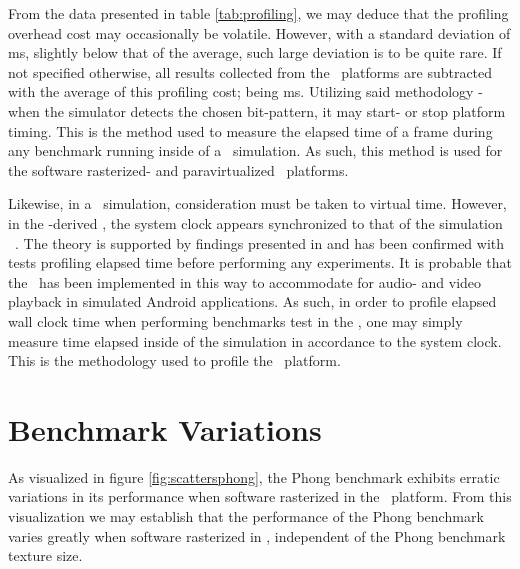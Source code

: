

From the data presented in table \ref{tab:profiling}, we may deduce that the profiling overhead cost may occasionally be volatile.
However, with a standard deviation of  ms, slightly below that of the average, such large deviation is to be quite rare.
If not specified otherwise, all results collected from the \dvttermsimics\ platforms are subtracted with the average of this profiling cost; being  ms.
Utilizing said methodology - when the simulator detects the chosen bit-pattern, it may start- or stop platform timing.
This is the method used to measure the elapsed time of a frame during any benchmark running inside of a \dvttermsimics\ simulation.
As such, this method is used for the software rasterized- and paravirtualized \dvttermsimics\ platforms. 

Likewise, in a \dvttermqemu\ simulation, consideration must be taken to virtual time.
However, in the \dvttermqemu -derived \dvttermandroidemulator , the system clock appears synchronized to that of the simulation \dvttermhost ~.
The theory is supported by findings presented in  and has been confirmed with tests profiling elapsed time before performing any experiments.
It is probable that the \dvttermandroidemulator\ has been implemented in this way to accommodate for audio- and video playback in simulated Android applications.
As such, in order to profile elapsed wall clock time when performing benchmarks test in the \dvttermandroidemulator , one may simply measure time elapsed inside of the simulation in accordance to the system clock.
This is the methodology used to profile the \dvttermqemu\ platform.

\section{Benchmark Variations}
\label{sec:threatstovalidity_benchmarkvariations}
As visualized in figure \ref{fig:scattersphong}, the Phong benchmark exhibits erratic variations in its performance when software rasterized in the \dvttermsimics\ platform.
From this visualization we may establish that the performance of the Phong benchmark varies greatly when software rasterized in \dvttermsimics , independent of the Phong benchmark texture size.

